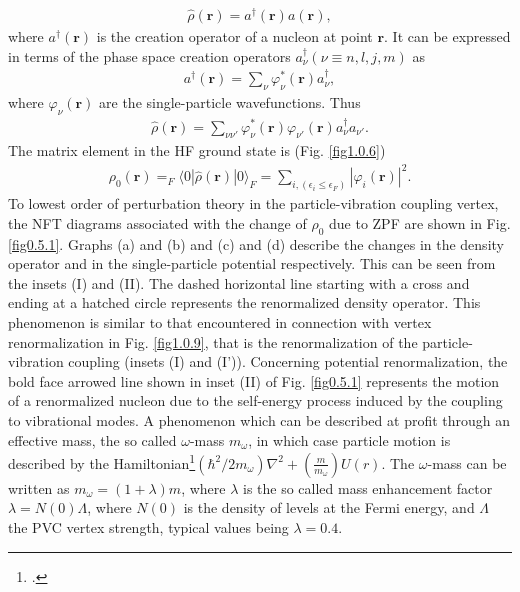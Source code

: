 \documentclass[a4paper,11pt]{book}
\numberwithin{equation}{section}
\numberwithin{figure}{section}
\numberwithin{table}{section}
\newcommand{\braket}[1]{\langle {#1} \rangle }
\begin{document}
\begin{align}\label{eq0.1.123}
\hat\rho(\mathbf r)=a^\dagger(\mathbf r)a(\mathbf r),
\end{align}
where $a^\dagger(\mathbf r)$ is the creation operator of a nucleon at point $\mathbf r$. It can be expressed in terms of the phase space creation operators $a^\dagger_\nu(\nu\equiv n,l,j,m)$ as
\begin{align}\label{eq0.1.124}
a^\dagger(\mathbf r)=\sum_\nu\varphi^*_\nu(\mathbf r) a^\dagger_\nu,
\end{align}
where $\varphi_\nu(\mathbf r)$ are the single-particle wavefunctions. Thus
\begin{align}\label{eq0.1.125}
\hat\rho(\mathbf r)=\sum_{\nu\nu'}\varphi^*_\nu(\mathbf r)\varphi_{\nu'}(\mathbf r)a^\dagger_\nu a_{\nu'}.
\end{align}
The matrix element in the HF ground state is (Fig. \ref{fig1.0.6})
\begin{align}\label{eq0.1.126}
\rho_0(\mathbf r)=_F\braket{0|\hat\rho(\mathbf r)|0}_F=\sum_{i, (\epsilon_i\leq\epsilon_F)}|\varphi_i(\mathbf r)|^2.
\end{align}
To lowest order of perturbation theory in the particle-vibration coupling vertex, the NFT diagrams associated with the change of $\rho_0$ due to ZPF are shown in Fig. \ref{fig0.5.1}. Graphs (a) and (b) and (c) and (d) describe the changes in the density operator and in the single-particle potential respectively. This can be seen from the insets (I) and (II). The dashed horizontal line starting with a cross and ending at a hatched circle represents the renormalized density operator. This phenomenon is similar to that encountered in connection with vertex renormalization in Fig. \ref{fig1.0.9}, that is the renormalization of the particle-vibration coupling (insets (I) and (I')). Concerning potential renormalization, the bold face arrowed line shown in inset (II) of Fig. \ref{fig0.5.1} represents the motion of a renormalized nucleon due to the self-energy process induced by the coupling to vibrational modes. A phenomenon which can be described at profit through an effective mass, the so called $\omega$-mass $m_\omega$, in which case particle motion is described by the Hamiltonian\footnote{\cite{Brink:05}.}$\left(\hbar^2/2m_\omega\right)\nabla^2+\left(\frac{m}{m_\omega}\right)U(r)$. The $\omega$-mass can be written as $m_\omega=(1+\lambda)m$, where $\lambda$ is the so called mass enhancement factor $\lambda=N(0)\Lambda$, where $N(0)$ is the density of levels at the Fermi energy, and $\Lambda$ the PVC vertex strength, typical values being $\lambda=0.4$.
\end{document}
